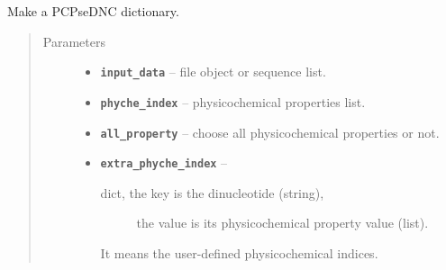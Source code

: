 \documentclass[letterpaper,10pt,english]{sphinxmanual}
\begin{document}

\begin{fulllineitems}
\label{reference/PyDNApsenac:PyDNApsenac.GetPCPseDNC}
Make a PCPseDNC dictionary.
\begin{quote}\begin{description}
\item[{Parameters}] \leavevmode\begin{itemize}
\item {} 
\textbf{\texttt{input\_data}} -- file object or sequence list.

\item {} 
\textbf{\texttt{phyche\_index}} -- physicochemical properties list.

\item {} 
\textbf{\texttt{all\_property}} -- choose all physicochemical properties or not.

\item {} 
\textbf{\texttt{extra\_phyche\_index}} -- \begin{description}
\item[{dict, the key is the dinucleotide (string),}] \leavevmode
the value is its physicochemical property value (list).

\end{description}

It means the user-defined physicochemical indices.


\end{itemize}

\end{description}\end{quote}

\end{fulllineitems}

\end{document}
